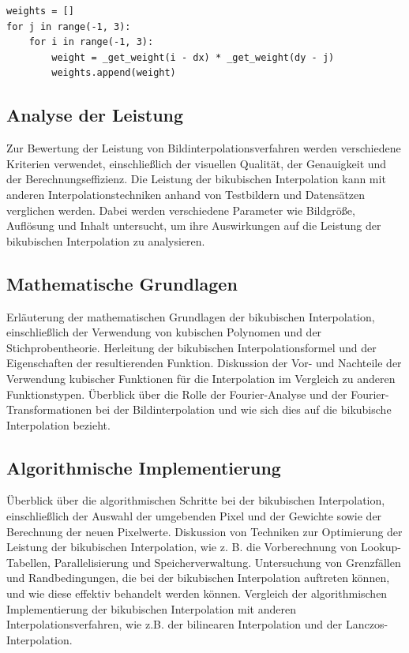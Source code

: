 \begin{lstlisting}
weights = []
for j in range(-1, 3):
    for i in range(-1, 3):
        weight = _get_weight(i - dx) * _get_weight(dy - j)
        weights.append(weight)
\end{lstlisting}

\subsection{Analyse der Leistung}

Zur Bewertung der Leistung von Bildinterpolationsverfahren werden verschiedene Kriterien verwendet, einschließlich der visuellen Qualität, der Genauigkeit und der Berechnungseffizienz. Die Leistung der bikubischen Interpolation kann mit anderen Interpolationstechniken anhand von Testbildern und Datensätzen verglichen werden. Dabei werden verschiedene Parameter wie Bildgröße, Auflösung und Inhalt untersucht, um ihre Auswirkungen auf die Leistung der bikubischen Interpolation zu analysieren. %









    \subsection{Mathematische Grundlagen}

    Erläuterung der mathematischen Grundlagen der bikubischen Interpolation, einschließlich der Verwendung von kubischen Polynomen und der Stichprobentheorie.
    Herleitung der bikubischen Interpolationsformel und der Eigenschaften der resultierenden Funktion.
    Diskussion der Vor- und Nachteile der Verwendung kubischer Funktionen für die Interpolation im Vergleich zu anderen Funktionstypen.
    Überblick über die Rolle der Fourier-Analyse und der Fourier-Transformationen bei der Bildinterpolation und wie sich dies auf die bikubische Interpolation bezieht.

    \subsection{Algorithmische Implementierung}

    Überblick über die algorithmischen Schritte bei der bikubischen Interpolation, einschließlich der Auswahl der umgebenden Pixel und der Gewichte sowie der Berechnung der neuen Pixelwerte.
    Diskussion von Techniken zur Optimierung der Leistung der bikubischen Interpolation, wie z. B. die Vorberechnung von Lookup-Tabellen, Parallelisierung und Speicherverwaltung.
    Untersuchung von Grenzfällen und Randbedingungen, die bei der bikubischen Interpolation auftreten können, und wie diese effektiv behandelt werden können.
    Vergleich der algorithmischen Implementierung der bikubischen Interpolation mit anderen Interpolationsverfahren, wie z.B. der bilinearen Interpolation und der Lanczos-Interpolation.

